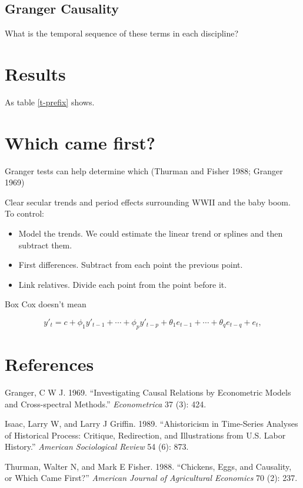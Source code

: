 \subsection{Granger Causality}\label{granger-causality}

What is the temporal sequence of these terms in each discipline?

\section{Results}\label{results}

As table \ref{t-prefix} shows.

\section{Which came first?}\label{which-came-first}

Granger tests can help determine which (Thurman and Fisher 1988; Granger
1969)

Clear secular trends and period effects surrounding WWII and the baby
boom. To control:

\begin{itemize}
\tightlist
\item
  Model the trends. We could estimate the linear trend or splines and
  then subtract them.
\item
  First differences. Subtract from each point the previous point.
\item
  Link relatives. Divide each point from the point before it.
\end{itemize}

Box Cox doesn't mean

\begin{equation}\tag{8.1}\label{eq-8-arima} y'_{t} = c +
\phi_{1}y'_{t-1} + \cdots + \phi_{p}y'_{t-p} +
\theta_{1}e_{t-1} + \cdots + \theta_{q}e_{t-q} + e_{t},
\end{equation}

\section*{References}\label{references}

\hypertarget{refs}{}
\hypertarget{ref-Granger:1969wx}{}
Granger, C W J. 1969. ``Investigating Causal Relations by Econometric
Models and Cross-spectral Methods.'' \emph{Econometrica} 37 (3): 424.

\hypertarget{ref-Isaac:1989hp}{}
Isaac, Larry W, and Larry J Griffin. 1989. ``Ahistoricism in Time-Series
Analyses of Historical Process: Critique, Redirection, and Illustrations
from U.S. Labor History.'' \emph{American Sociological Review} 54 (6):
873.

\hypertarget{ref-Thurman:1988va}{}
Thurman, Walter N, and Mark E Fisher. 1988. ``Chickens, Eggs, and
Causality, or Which Came First?'' \emph{American Journal of Agricultural
Economics} 70 (2): 237.
